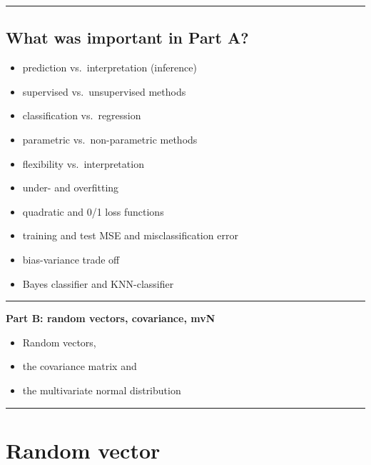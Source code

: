 \documentclass[]{article}
\providecommand{\tightlist}{%
  \setlength{\itemsep}{0pt}\setlength{\parskip}{0pt}}
\begin{document}
\begin{center}\rule{0.5\linewidth}{\linethickness}\end{center}

\hypertarget{what-was-important-in-part-a}{%
\subsection{What was important in Part
A?}\label{what-was-important-in-part-a}}

\begin{itemize}
\tightlist
\item
  prediction vs.~interpretation (inference)
\item
  supervised vs.~unsupervised methods
\item
  classification vs.~regression
\item
  parametric vs.~non-parametric methods
\item
  flexibility vs.~interpretation
\item
  under- and overfitting
\item
  quadratic and 0/1 loss functions
\item
  training and test MSE and misclassification error
\item
  bias-variance trade off
\item
  Bayes classifier and KNN-classifier
\end{itemize}

\begin{center}\rule{0.5\linewidth}{\linethickness}\end{center}

\large

\textbf{Part B: random vectors, covariance, mvN}

\normalsize

\begin{itemize}
\tightlist
\item
  Random vectors,
\item
  the covariance matrix and
\item
  the multivariate normal distribution
\end{itemize}

\begin{center}\rule{0.5\linewidth}{\linethickness}\end{center}

\hypertarget{random-vector}{%
\section{Random vector}\label{random-vector}}
\end{document}
